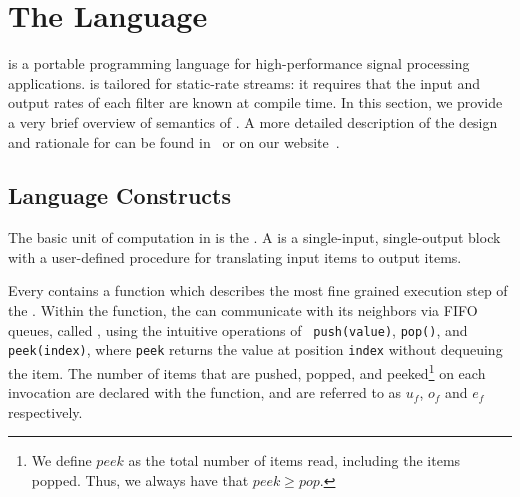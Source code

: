 \section{The {\StreamIt} Language}
\label{sec:streamit}

{\StreamIt} is a portable programming language for
high-performance signal processing applications.  {\StreamIt} is
tailored for static-rate streams: it requires that the input and
output rates of each filter are known at compile time.  In this
section, we provide a very brief overview of
semantics of {\StreamIt}.  A more detailed description of the design
and rationale for {\StreamIt} can be found in~\cite{thies02streamit} or
on our website~\cite{streamitweb}.

\subsection{Language Constructs}

The basic unit of computation in {\StreamIt} is the {\filter}. A
\filter is a single-input, single-output block with a user-defined
procedure for translating input items to output items.
\begin{comment}
An example of a filter is the {\tt FIRFilter}, a component of our
software radio (see Figure \ref{fig:radiocode}). Each filter
contains an {\tt init} function that is called at initialization
time; in this case, the {\tt FIRFilter} calculates {\tt weights},
which represents its impulse response.
\end{comment}
Every {\filter} contains a {\work} function which describes the most
fine grained execution step of the {\filter}. Within the {\work}
function, the {\filter} can communicate with its neighbors via FIFO
queues, called {\Channels}, using the intuitive operations of {\tt
push(value)}, {\tt pop()}, and {\tt peek(index)}, where {\tt peek}
returns the value at position {\tt index} without dequeuing the
item.  The number of items that are pushed, popped, and
peeked\footnote{We define $peek$ as the total number of items
read, including the items popped.  Thus, we always have that $peek
\ge pop$.} on each invocation are declared with the {\work}
function, and are referred to as $u_f$, $o_f$ and $e_f$
respectively.

\begin{comment}
In addition to {\tt work}, a filter can contain a {\tt prework}
function that is executed exactly once between initialization and
the steady-state.  Like {\tt work}, {\tt prework} can access the
input and output tapes of the filter; however, the I/O rates of
{\tt work} and {\tt prework} can differ. In an {\tt FIRFilter}, a
{\tt prework} function is essential for correctly filtering the
beginning of the input stream.  The user never calls the {\tt
init}, {\tt prework}, and {\tt work} functions--they are all
called automatically.
\end{comment}

